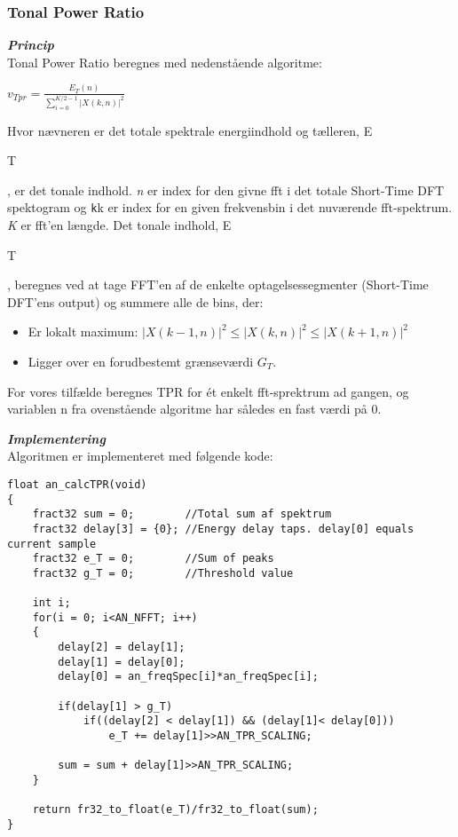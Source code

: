\subsubsection{Tonal Power Ratio}
\textit{\textbf{Princip}} \\
Tonal Power Ratio beregnes med nedenstående algoritme: 
\begin{center}
${ v }_{ Tpr }=\frac { { E }_{ T }(n) }{ \sum _{ i=0 }^{ K/2-1 }{ { \left| X(k,n) \right|  }^{ 2 } }  } $
\end{center}
Hvor nævneren er det totale spektrale energiindhold og tælleren, E\begin{tiny}T\end{tiny}, er det tonale indhold. 
\textit{n} er index for den givne fft i det totale Short-Time DFT spektogram og \verb+k+k er index for en given frekvensbin i det nuværende fft-spektrum. \textit{K} er fft'en længde.
Det tonale indhold, E\begin{tiny}T\end{tiny}, beregnes ved at tage FFT'en af de enkelte optagelsessegmenter (Short-Time DFT'ens output) og summere alle de bins, der:
\begin{itemize}
	\item Er lokalt maximum: ${ \left| X(k-1,n) \right|  }^{ 2 }\le { \left| X(k,n) \right|  }^{ 2 }\le { \left| X(k+1,n) \right|  }^{ 2 }$
	\item Ligger over en forudbestemt grænseværdi ${ G }_{ T }$.
\end{itemize} 

For vores tilfælde beregnes TPR for ét enkelt fft-sprektrum ad gangen, og variablen n fra ovenstående algoritme har således en fast værdi på 0.

\textit{\textbf{Implementering}} \\
Algoritmen er implementeret med følgende kode:
\begin{verbatim}float an_calcTPR(void)
{
    fract32 sum = 0;		//Total sum af spektrum
    fract32 delay[3] = {0};	//Energy delay taps. delay[0] equals current sample
    fract32 e_T = 0;		//Sum of peaks
    fract32 g_T = 0;		//Threshold value

    int i;
    for(i = 0; i<AN_NFFT; i++)
    {
        delay[2] = delay[1];
        delay[1] = delay[0];
        delay[0] = an_freqSpec[i]*an_freqSpec[i];

        if(delay[1] > g_T)
            if((delay[2] < delay[1]) && (delay[1]< delay[0]))
                e_T += delay[1]>>AN_TPR_SCALING;

        sum = sum + delay[1]>>AN_TPR_SCALING;
    }

    return fr32_to_float(e_T)/fr32_to_float(sum);
}\end{verbatim}

